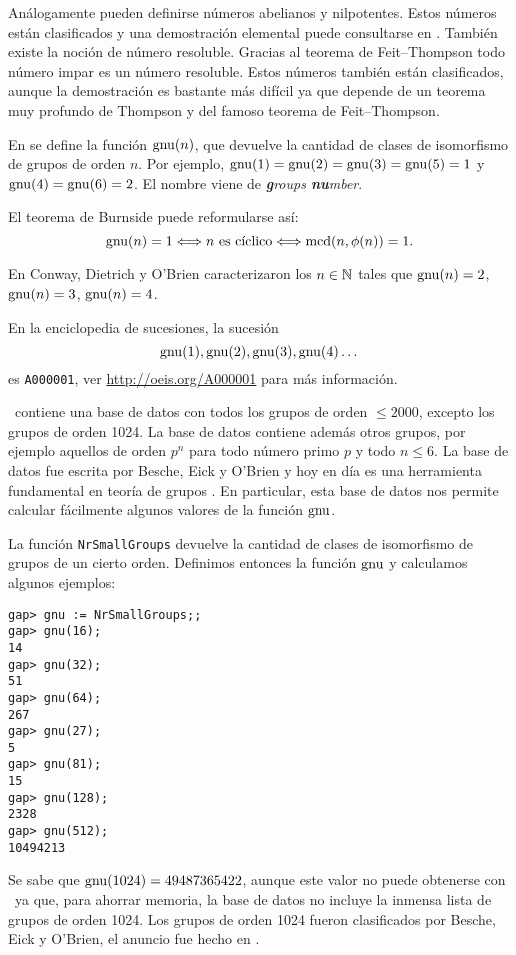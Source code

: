 Análogamente pueden definirse números abelianos y nilpotentes. Estos números 
están clasificados y una demostración elemental puede consultarse en \cite{MR1786236}. 
También existe la noción de número resoluble. Gracias al teorema de Feit--Thompson 
todo número impar es un número resoluble. 
Estos números también están clasificados, aunque
la demostración es bastante más difícil ya que depende de un teorema muy profundo de Thompson y del 
famoso teorema de Feit--Thompson. 

\medskip
En \cite{MR2410121} se define la función $\operatorname{gnu}(n)$, que devuelve la cantidad de clases de isomorfismo 
de grupos de orden $n$. Por ejemplo, $\operatorname{gnu}(1)=\operatorname{gnu}(2)=\operatorname{gnu}(3)=\operatorname{gnu}(5)=1$ y $\operatorname{gnu}(4)=\operatorname{gnu}(6)=2$. 
El nombre viene de \emph{\textbf{g}roups \textbf{nu}mber}. 

El teorema de Burnside puede reformularse así: 
\[
\operatorname{gnu}(n)=1\Longleftrightarrow\text{$n$ es cíclico}\Longleftrightarrow\operatorname{mcd}(n,\phi(n))=1.
\]

En \cite{MR2410121} Conway, Dietrich y O'Brien caracterizaron los $n\in\mathbb{N}$ tales que
$\operatorname{gnu}(n)=2$, $\operatorname{gnu}(n)=3$, $\operatorname{gnu}(n)=4$. 

En la enciclopedia de sucesiones, 
la sucesión 
\[
\operatorname{gnu}(1),\operatorname{gnu}(2),\operatorname{gnu}(3),\operatorname{gnu}(4)\dots
\]
es \lstinline{A000001}, ver \url{http://oeis.org/A000001} para más información. 

\GAP~contiene una base de datos con todos los grupos de orden $\leq2000$, excepto los 
grupos de orden 1024. La base de datos contiene además otros grupos, por ejemplo
aquellos de orden $p^n$ para todo número primo $p$ y todo $n\leq 6$. La base de datos
fue escrita por Besche, Eick y O'Brien y hoy en día es una herramienta fundamental 
en teoría de grupos \cite{MR1935567}. En particular, esta base de datos nos permite
calcular fácilmente algunos valores de la función $\operatorname{gnu}$. 

La función \lstinline{NrSmallGroups} devuelve la cantidad de clases de isomorfismo de grupos
de un cierto orden. Definimos entonces la función $\operatorname{gnu}$ y calculamos algunos ejemplos:

\begin{lstlisting}
gap> gnu := NrSmallGroups;;
gap> gnu(16);
14
gap> gnu(32);
51
gap> gnu(64);
267
gap> gnu(27);
5
gap> gnu(81);
15
gap> gnu(128);
2328
gap> gnu(512);
10494213
\end{lstlisting}

Se sabe que $\operatorname{gnu}(1024)=49487365422$, aunque este valor no puede obtenerse  
con \GAP~ya que, para ahorrar memoria, 
la base de datos no incluye la inmensa lista de grupos de orden 1024. Los grupos
de orden 1024 fueron clasificados por
Besche, Eick y O'Brien, el anuncio fue hecho en \cite{MR1826989}. 

